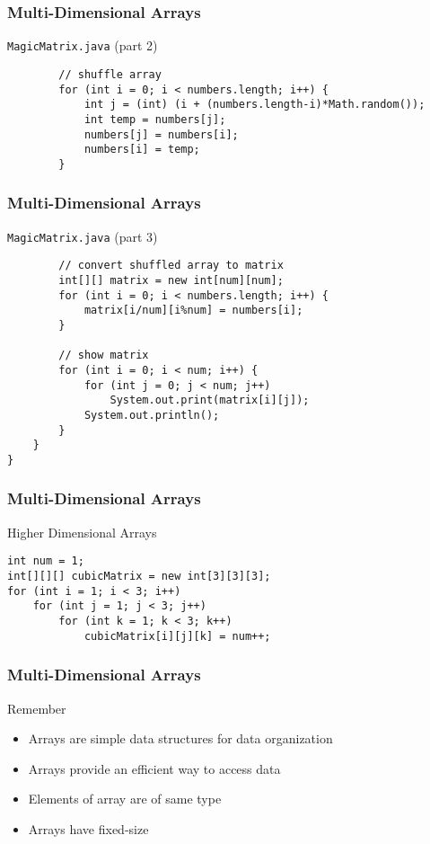 \documentclass[10pt, compress]{beamer}
\begin{document}
\begin{frame}[fragile]
	\frametitle{Multi-Dimensional Arrays}
	\begin{block}{\texttt{MagicMatrix.java} (part 2)}
		\begin{verbatim}
		// shuffle array
		for (int i = 0; i < numbers.length; i++) {
			int j = (int) (i + (numbers.length-i)*Math.random());
			int temp = numbers[j];
			numbers[j] = numbers[i];
			numbers[i] = temp;
		}
		\end{verbatim}
	\end{block}
\end{frame}

\begin{frame}[fragile]
	\frametitle{Multi-Dimensional Arrays}
	\begin{block}{\texttt{MagicMatrix.java} (part 3)}
		\begin{verbatim}
		// convert shuffled array to matrix
		int[][] matrix = new int[num][num];
		for (int i = 0; i < numbers.length; i++) {
			matrix[i/num][i%num] = numbers[i];
		}

		// show matrix
		for (int i = 0; i < num; i++) {
			for (int j = 0; j < num; j++)
				System.out.print(matrix[i][j]);
			System.out.println();
		}
	}
}
		\end{verbatim}
	\end{block}
\end{frame}

\begin{frame}[fragile]
	\frametitle{Multi-Dimensional Arrays}
	\begin{block}{Higher Dimensional Arrays}
		\begin{verbatim}
int num = 1;
int[][][] cubicMatrix = new int[3][3][3];
for (int i = 1; i < 3; i++)
	for (int j = 1; j < 3; j++)
		for (int k = 1; k < 3; k++)
			cubicMatrix[i][j][k] = num++;
		\end{verbatim}
	\end{block}
\end{frame}

\begin{frame}[fragile]
	\frametitle{Multi-Dimensional Arrays}
	\begin{block}{Remember}
		\begin{itemize}
			\item[] Arrays are simple data structures for data organization
			\item[] Arrays provide an efficient way to access data
			\item[] Elements of array are of same type
			\item[] Arrays have fixed-size
		\end{itemize}
	\end{block}
\end{frame}

\end{document}
